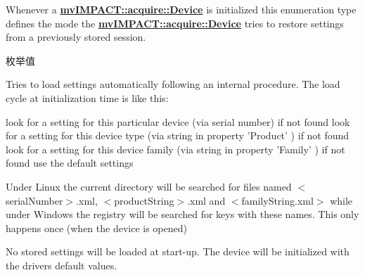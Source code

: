 Whenever a {\bfseries \hyperlink{classmv_i_m_p_a_c_t_1_1acquire_1_1_device}{mv\+I\+M\+P\+A\+C\+T\+::acquire\+::\+Device}} is initialized this enumeration type defines the mode the {\bfseries \hyperlink{classmv_i_m_p_a_c_t_1_1acquire_1_1_device}{mv\+I\+M\+P\+A\+C\+T\+::acquire\+::\+Device}} tries to restore settings from a previously stored session. \begin{Desc}
\item[枚举值]\par
\begin{description}
\item[{\em 
\hypertarget{group___common_interface_ggae5dacc6187e94639fe9153711917d6e3a2f1ebbfd3f6fffa2e1845536517dc41b}{dls\+Auto}\label{group___common_interface_ggae5dacc6187e94639fe9153711917d6e3a2f1ebbfd3f6fffa2e1845536517dc41b}
}]Tries to load settings automatically following an internal procedure. The load cycle at initialization time is like this\+:


\begin{DoxyCode}
look \textcolor{keywordflow}{for} a setting \textcolor{keywordflow}{for} \textcolor{keyword}{this} particular device (via serial number)
\textcolor{keywordflow}{if} not found
  look \textcolor{keywordflow}{for} a setting \textcolor{keywordflow}{for} \textcolor{keyword}{this} device type (via \textcolor{keywordtype}{string} in property \textcolor{stringliteral}{'Product'} )
  \textcolor{keywordflow}{if} not found
    look \textcolor{keywordflow}{for} a setting \textcolor{keywordflow}{for} \textcolor{keyword}{this} device family (via \textcolor{keywordtype}{string} in property \textcolor{stringliteral}{'Family'} )
    \textcolor{keywordflow}{if} not found
      use the \textcolor{keywordflow}{default} settings
\end{DoxyCode}


Under Linux\textregistered{} the current directory will be searched for files named $<$serial\+Number$>$.xml, $<$product\+String$>$.xml and $<$family\+String.\+xml$>$ while under Windows\textregistered{} the registry will be searched for keys with these names. This only happens once (when the device is opened) \item[{\em 
\hypertarget{group___common_interface_ggae5dacc6187e94639fe9153711917d6e3af68205716389544a087d51a8492f5d92}{dls\+No\+Load}\label{group___common_interface_ggae5dacc6187e94639fe9153711917d6e3af68205716389544a087d51a8492f5d92}
}]No stored settings will be loaded at start-\/up. The device will be initialized with the drivers default values. \end{description}
\end{Desc}
